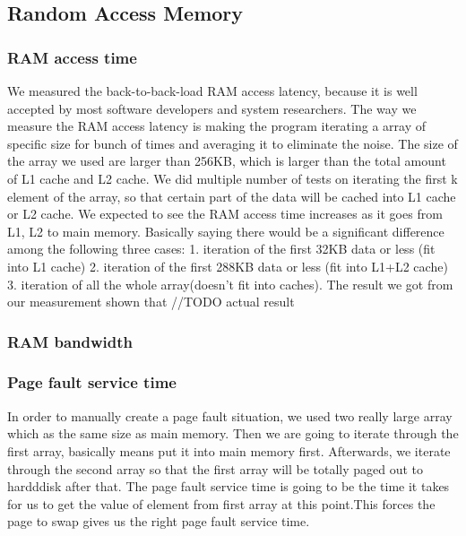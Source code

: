 \subsection{Random Access Memory}

\subsubsection{RAM access time}
We measured the back-to-back-load RAM access latency, because it is well accepted by most software developers and system researchers. The way we measure the RAM access latency is making the program iterating a array of specific size for bunch of times and averaging it to eliminate the noise. The size of the array we used are larger than 256KB, which is larger than the total amount of L1 cache and L2 cache. We did multiple number of tests on iterating the first k element of the array, so that certain part of the data will be cached into L1 cache or L2 cache.
We expected to see the RAM access time increases as it goes from L1, L2 to main memory. Basically saying there would be a significant difference among the following three cases: 
1. iteration of the first 32KB data or less (fit into L1 cache)
2. iteration of the first 288KB data or less (fit into L1+L2 cache)
3. iteration of all the whole array(doesn’t fit into caches).
The result we got from our measurement shown that //TODO actual result






\subsubsection{RAM bandwidth}






\subsubsection{Page fault service time}

In order to manually create a page fault situation, we used two really large array which as the same size as main memory. Then we are going to iterate through the first array, basically means put it into main memory first. Afterwards, we iterate through the second array so that the first array will be totally paged out to hardddisk after that. The page fault service time is going to be the time it takes for us to get the value of element from first array at this point.This forces the page to swap gives us the right page fault service time. 
